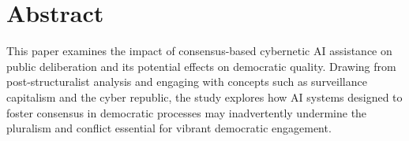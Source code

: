 \chapter*{Abstract}
This paper examines the impact of consensus-based cybernetic AI assistance on public deliberation and its potential effects on democratic quality. Drawing from post-structuralist analysis and engaging with concepts such as surveillance capitalism and the cyber republic, the study explores how AI systems designed to foster consensus in democratic processes may inadvertently undermine the pluralism and conflict essential for vibrant democratic engagement.%
%
%
%
%
%
%
%
%  
%


